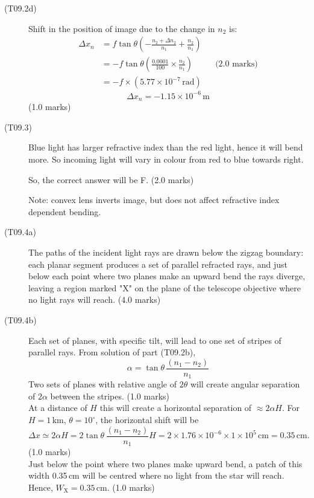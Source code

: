 \begin{description}
\item[(T09.2d)]
Shift in the position of image due to the change in $n_2$ is:
\begin{align*}
\Delta x_n &= f\tan\theta
  \left(-\frac{n_2 + \Delta n_2}{n_1} + \frac{n_2}{n_1}\right) \\
  &= -f\tan\theta\left(\frac{0.0001}{100} \times \frac{n_2}{n_1}\right)
  && \text{(2.0 marks)} \\
  &= -f \times (5.77 \times 10^{-7}\,\mathrm{rad})
\end{align*}
\[ \Delta x_n = -1.15 \times 10^{-6}\,\mathrm{m} \]
\hfill(1.0 marks)

\item[(T09.3)]
Blue light has larger refractive index than the red light, hence it will
bend more. So incoming light will vary in colour from red to blue towards
right.

So, the correct answer will be F. \hfill(2.0 marks)

Note: convex lens inverts image, but does not affect refractive index
dependent bending.

\item[(T09.4a)]
The paths of the incident light rays are drawn below the zigzag boundary:
each planar segment produces a set of parallel refracted rays, and just
below each point where two planes make an upward bend the rays diverge,
leaving a region marked "X" on the plane of the telescope objective where no
light rays will reach. \hfill(4.0 marks)

\item[(T09.4b)]
Each set of planes, with specific tilt, will lead to one set of stripes of
parallel rays. From solution of part (T09.2b),
\[ \alpha = \tan\theta\,\frac{(n_1 - n_2)}{n_1} \]
Two sets of planes with relative angle of $2\theta$ will create angular
separation of $2\alpha$ between the stripes. \hfill(1.0 marks)\\
At a distance of $H$ this will create a horizontal separation of
$\approx 2\alpha H$. For $H = 1$\,km, $\theta = 10^\circ$, the horizontal
shift will be
\[ \Delta x \simeq 2\alpha H = 2\tan\theta\,\frac{(n_1 - n_2)}{n_1}H
   = 2 \times 1.76 \times 10^{-6} \times 1 \times 10^{5}\,\mathrm{cm}
   = 0.35\,\mathrm{cm}. \]
\hfill(1.0 marks)\\
Just below the point where two planes make upward bend, a patch of this
width 0.35\,cm will be centred where no light from the star will reach.
Hence, $W_{\mathrm{X}} = 0.35$\,cm. \hfill(1.0 marks)


\end{description}
